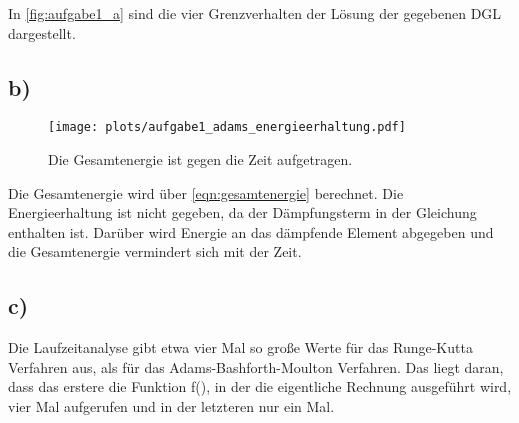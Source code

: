 In \autoref{fig:aufgabe1_a} sind die vier Grenzverhalten der Lösung der gegebenen DGL dargestellt.

\subsection*{b)}
  \begin{figure}[H]
    \centering
    \texttt{[image: plots/aufgabe1\_adams\_energieerhaltung.pdf]} \vspace*{-0.6cm}
    \caption{Die Gesamtenergie ist gegen die Zeit aufgetragen.}
    \label{fig:aufgabe1_adams_energieerhaltung}
  \end{figure}
  \FloatBarrier

  Die Gesamtenergie wird über \autoref{eqn:gesamtenergie} berechnet.
  Die Energieerhaltung ist nicht gegeben, da der Dämpfungsterm in der Gleichung enthalten ist. Darüber wird Energie an das dämpfende Element abgegeben und die Gesamtenergie vermindert sich mit der Zeit.

\subsection*{c)}
  Die Laufzeitanalyse gibt etwa vier Mal so große Werte für das Runge-Kutta Verfahren aus, als für das Adams-Bashforth-Moulton Verfahren.
  Das liegt daran, dass das erstere die Funktion f(), in der die eigentliche Rechnung ausgeführt wird, vier Mal aufgerufen und in der letzteren nur ein Mal.

